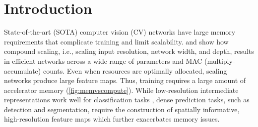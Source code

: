 \documentclass{article}
\begin{document}
\printAffiliationsAndNotice{}

\section{Introduction}
\label{sec:intro}

State-of-the-art (SOTA) computer vision (CV) networks have large memory requirements that complicate training and limit scalability.
\citet{tan2019efficientnet} and \citet{dollar2021fast} show how compound scaling, i.e., scaling input resolution, network width, and depth, results in efficient networks across a wide range of parameters and MAC (multiply-accumulate) counts.
Even when resources are optimally allocated, scaling networks produce large feature maps. Thus, training requires a large amount of accelerator memory (\cref{fig:memvscompute}).
While low-resolution intermediate representations work well for classification tasks \cite{leCun1998gradient, krizhevsky2012imagenet, simonyan2014very, tan2019efficientnet}, dense prediction tasks, such as detection and segmentation, require the construction of spatially informative, high-resolution feature maps which further exacerbates memory issues.
\end{document}
